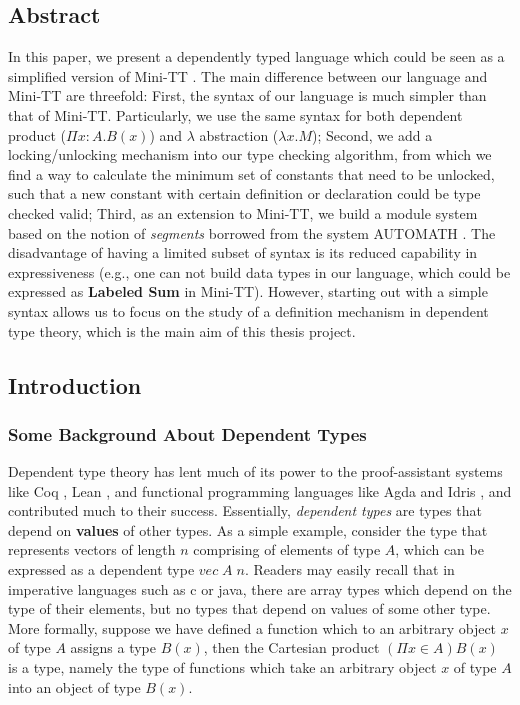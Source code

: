 \documentclass{article}
\theoremstyle{remark}
\begin{document}
\subsection{Abstract}
In this paper, we present a dependently typed language which could be seen as a simplified version of Mini-TT \cite{coquand2009simple}. The main difference between our language and Mini-TT are threefold: First, the syntax of our language is much simpler than that of Mini-TT. Particularly, we use the same syntax for both dependent product ($\Pi x:A.B(x)$) and $\lambda$ abstraction ($\lambda x . M$); Second, we add a locking/unlocking mechanism into our type checking algorithm, from which we find a way to calculate the minimum set of constants that need to be unlocked, such that a new constant with certain definition or declaration could be type checked valid; Third, as an extension to Mini-TT, we build a module system based on the notion of \emph{segments} borrowed from the system AUTOMATH \cite{de1994survey}. The disadvantage of having a limited subset of syntax is its reduced capability in expressiveness (e.g., one can not build data types in our language, which could be expressed as \textbf{Labeled Sum} in Mini-TT). However, starting out with a simple syntax allows us to focus on the study of a definition mechanism in dependent type theory, which is the main aim of this thesis project. 

\subsection{Introduction}
\subsubsection{Some Background About Dependent Types}
Dependent type theory has lent much of its power to the proof-assistant systems like Coq \cite{huet1997coq}, Lean \cite{de2015lean}, and functional programming languages like Agda \cite{norell2008dependently} and Idris \cite{brady2013idris}, and contributed much to their success. Essentially, \emph{dependent types} are types that depend on \textbf{values} of other types. As a simple example, consider the type that represents vectors of length $n$ comprising of elements of type $A$, which can be expressed as a dependent type $vec\; A\; n$. Readers may easily recall that in imperative languages such as c or java, there are array types which depend on the type of their elements, but no types that depend on values of some other type. More formally, suppose we have defined a function which to an arbitrary object $x$ of type $A$ assigns a type $B(x)$, then the Cartesian product $(\Pi x \in A)B(x)$ is a type, namely the type of functions which take an arbitrary object $x$ of type $A$ into an object of type $B(x)$.
\end{document}

